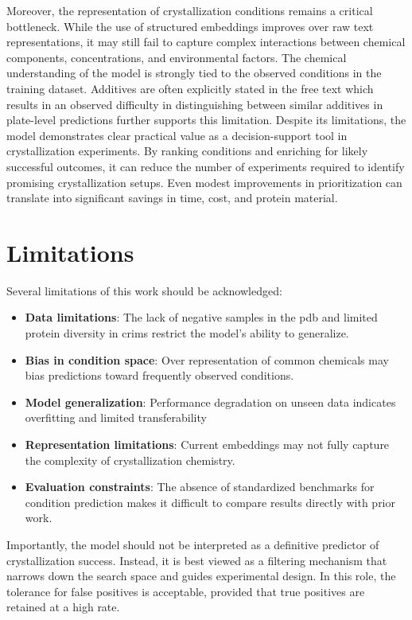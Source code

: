 Moreover, the representation of crystallization conditions remains a critical bottleneck. While the use of structured embeddings improves over raw text representations, it may still fail to capture complex interactions between chemical components, concentrations, and environmental factors. The chemical understanding of the model is strongly tied to the observed conditions in the training dataset. Additives are often explicitly stated in the free text which results in an observed difficulty in distinguishing between similar additives in plate-level predictions further supports this limitation. Despite its limitations, the model demonstrates clear practical value as a decision-support tool in crystallization experiments. By ranking conditions and enriching for likely successful outcomes, it can reduce the number of experiments required to identify promising crystallization setups. Even modest improvements in prioritization can translate into significant savings in time, cost, and protein material.

\section{Limitations}

Several limitations of this work should be acknowledged:

\begin{itemize}\itemsep0em
    \item \textbf{Data limitations}: The lack of negative samples in the \gls{pdb} and limited protein diversity in \gls{crims} restrict the model’s ability to generalize.
    \item \textbf{Bias in condition space}: Over representation of common chemicals may bias predictions toward frequently observed conditions.
    \item \textbf{Model generalization}: Performance degradation on unseen data indicates overfitting and limited transferability
    \item \textbf{Representation limitations}: Current embeddings may not fully capture the complexity of crystallization chemistry.
    \item \textbf{Evaluation constraints}: The absence of standardized benchmarks for condition prediction makes it difficult to compare results directly with prior work.
\end{itemize}

Importantly, the model should not be interpreted as a definitive predictor of crystallization success. Instead, it is best viewed as a filtering mechanism that narrows down the search space and guides experimental design. In this role, the tolerance for false positives is acceptable, provided that true positives are retained at a high rate. 

